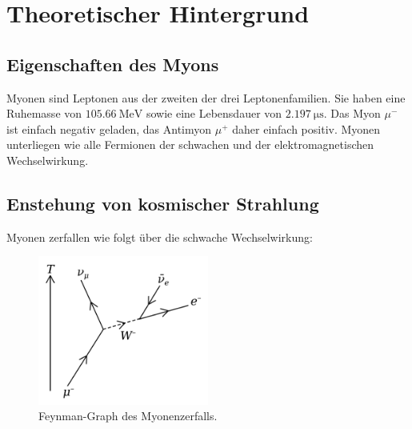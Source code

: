 \section{Theoretischer Hintergrund}
\label{sec:Theorie}

\subsection{Eigenschaften des Myons}
\label{subsec:Eigenschaften}

Myonen sind Leptonen aus der zweiten der drei Leptonenfamilien. Sie haben
eine Ruhemasse von $\SI{105.66}{\mega\electronvolt}$ sowie eine Lebensdauer
von $\SI{2.197}{\micro\second}$. Das Myon $\mu^{-}$ ist einfach negativ geladen,
das Antimyon $\mu^{+}$ daher einfach positiv.
Myonen unterliegen wie alle Fermionen der schwachen und der elektromagnetischen
Wechselwirkung.

\subsection{Enstehung von kosmischer Strahlung}
\label{subsec:kosmischeStrahlung}



Myonen zerfallen wie folgt über die schwache Wechselwirkung:
\begin{figure}
  \centering
  \includegraphics[width=0.5\textwidth]{pictures/Muon_Decay.png}
  \caption{Feynman-Graph des Myonenzerfalls.\cite{Myon-Wikipedia}}
  \label{zerfall}
\end{figure}

